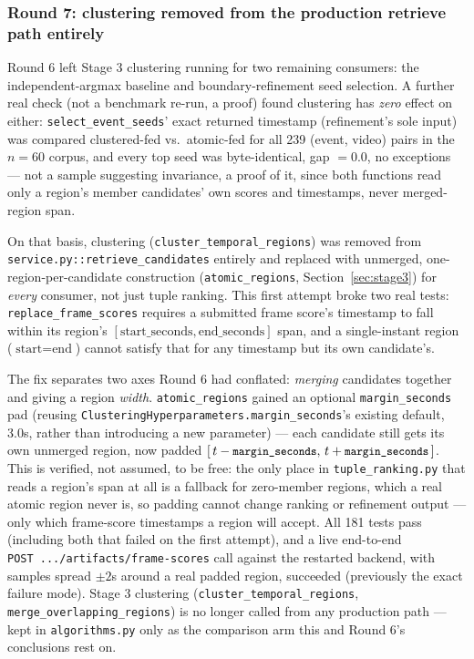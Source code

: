 \documentclass[11pt]{article}
\newcommand{\code}[1]{\texttt{\small #1}}
\newcommand{\file}[1]{\texttt{\footnotesize #1}}
\begin{document}
\subsubsection{Round 7: clustering removed from the production retrieve path entirely}
\label{sec:tuple-round7}
Round 6 left Stage 3 clustering running for two remaining consumers: the independent-argmax baseline
and boundary-refinement seed selection. A further real check (not a benchmark re-run, a proof) found
clustering has \emph{zero} effect on either: \code{select\_event\_seeds}' exact returned timestamp
(refinement's sole input) was compared clustered-fed vs.\ atomic-fed for all 239 (event, video) pairs
in the $n=60$ corpus, and every top seed was byte-identical, gap $=0.0$, no exceptions --- not a
sample suggesting invariance, a proof of it, since both functions read only a region's member
candidates' own scores and timestamps, never merged-region span.

On that basis, clustering (\code{cluster\_temporal\_regions}) was removed from
\code{service.py::retrieve\_candidates} entirely and replaced with unmerged, one-region-per-candidate
construction (\code{atomic\_regions}, Section~\ref{sec:stage3}) for \emph{every} consumer, not just
tuple ranking. This first attempt broke two real tests: \code{replace\_frame\_scores} requires a
submitted frame score's timestamp to fall within its region's $[\text{start\_seconds},
\text{end\_seconds}]$ span, and a single-instant region ($\text{start}=\text{end}$) cannot satisfy
that for any timestamp but its own candidate's.

The fix separates two axes Round 6 had conflated: \emph{merging} candidates together and giving a
region \emph{width}. \code{atomic\_regions} gained an optional \code{margin\_seconds} pad (reusing
\code{ClusteringHyperparameters.margin\_seconds}'s existing default, 3.0s, rather than introducing a
new parameter) --- each candidate still gets its own unmerged region, now padded
$[\,t-\code{margin\_seconds},\,t+\code{margin\_seconds}\,]$. This is verified, not assumed, to be
free: the only place in \code{tuple\_ranking.py} that reads a region's span at all is a fallback for
zero-member regions, which a real atomic region never is, so padding cannot change ranking or
refinement output --- only which frame-score timestamps a region will accept. All 181 tests pass
(including both that failed on the first attempt), and a live end-to-end
\code{POST~.../artifacts/frame-scores} call against the restarted backend, with samples spread
$\pm2$s around a real padded region, succeeded (previously the exact failure mode). Stage 3 clustering
(\code{cluster\_temporal\_regions}, \code{merge\_overlapping\_regions}) is no longer called from any
production path --- kept in \file{algorithms.py} only as the comparison arm this and Round 6's
conclusions rest on.
\end{document}
